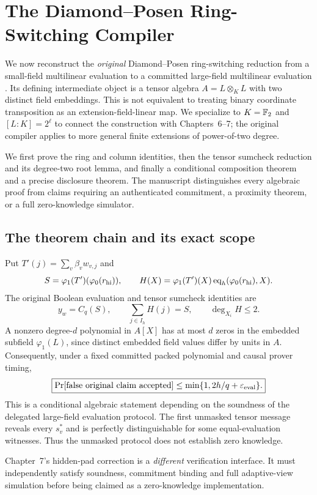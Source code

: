 \section{The Diamond--Posen Ring-Switching Compiler}\label{sec:dpr}

We now reconstruct the \emph{original} Diamond--Posen
ring-switching reduction from a small-field
multilinear evaluation to a committed
large-field multilinear evaluation
\cite[Section~4]{DiamondPosen2024}.
Its defining intermediate object is a
tensor algebra $A=L\otimes_K L$
with two distinct field embeddings.
This is not equivalent to treating
binary coordinate transposition as an
extension-field-linear map.
We specialize to $K=\mathbb{F}_2$ and
$[L:K]=2^\ell$ to connect the
construction with Chapters~6--7;
the original compiler applies to
more general finite extensions of
power-of-two degree.

We first prove the ring and column
identities, then the tensor
sumcheck reduction and its
degree-two root lemma, and finally
a conditional composition theorem
and a precise disclosure theorem.
The manuscript distinguishes every
algebraic proof from claims requiring
an authenticated commitment,
a proximity theorem, or
a full zero-knowledge simulator.









\subsection{The theorem chain and its exact scope}\label{sec:dpr:conclusion}
Put $T'(j)=\sum_v\beta_vw_{v,j}$ and
\[
 S=\varphi_1(T')(\varphi_0(r_{\rm hi})),
 \qquad
 H(X)=\varphi_1(T')(X)
      \operatorname{eq}_h(\varphi_0(r_{\rm hi}),X).
\]
The original Boolean evaluation and
tensor sumcheck identities are
\[
 \boxed{
 y_w=C_q(S),\qquad
 \sum_{j\in I_h}H(j)=S,\qquad
 \deg_{X_i}H\leq2.}
\]
A nonzero degree-$d$ polynomial
in $A[X]$ has at most $d$
zeros in the embedded subfield
$\varphi_1(L)$, since distinct
embedded field values differ
by units in $A$.
Consequently, under a fixed
committed packed polynomial and
causal prover timing,
\[
 \boxed{
 \Pr[\text{false original claim accepted}]
 \leq
 \min\{1,2h/q+\varepsilon_{\rm eval}\}.}
\]
This is a conditional algebraic
statement depending on the
soundness of the delegated
large-field evaluation protocol.
The first unmasked tensor message
reveals every $s_v^*$ and is
perfectly distinguishable for
some equal-evaluation witnesses.
Thus the unmasked protocol
does not establish zero knowledge.

Chapter~7's hidden-pad correction
is a \emph{different} verification
interface. It must independently
satisfy soundness, commitment
binding and full adaptive-view
simulation before being claimed
as a zero-knowledge implementation.
